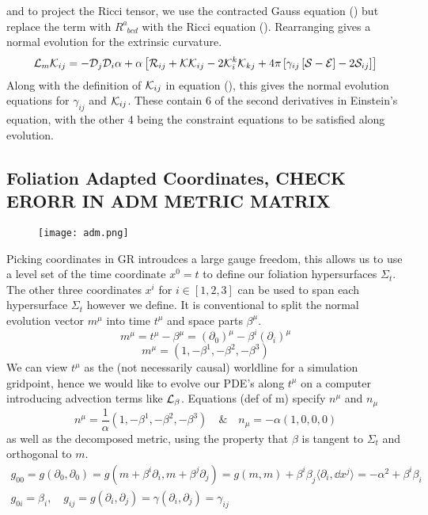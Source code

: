and to project the Ricci tensor, we use the contracted Gauss equation () but replace the term with $R^a_{\,\,\,bcd}$ with the Ricci equation (). Rearranging gives a normal evolution for the extrinsic curvature.
\begin{equation} \mathcal{L}_m \mathcal{K}_{ij} = -\mathcal{D}_j\mathcal{D}_i \alpha + \alpha \left[ \mathcal{R}_{ij} + \mathcal{K}\mathcal{K}_{ij} - 2\mathcal{K}^k_i\mathcal{K}_{kj} + 4\pi \left[ \gamma_{ij}\left[ \mathcal{S}-\mathcal{E}\right]-2\mathcal{S}_{ij}\right]\right]\end{equation}
Along with the definition of $\mathcal{K}_{ij}$ in equation (), this gives the normal evolution equations for $\gamma_{ij}$ and $\mathcal{K}_{ij}$. These contain 6 of the second derivatives in Einstein's equation, with the other 4 being the constraint equations to be satisfied along evolution.

\subsection{Foliation Adapted Coordinates, CHECK ERORR IN ADM METRIC MATRIX}
\begin{wrapfigure}{r}{0.65\textwidth}
    \texttt{[image: adm.png]}
\end{wrapfigure}
Picking coordinates in GR introudces a large gauge freedom, this allows us to use a level set of the time coordinate $x^0=t$ to define our foliation hypersurfaces $\Sigma_t$. The other three coordinates $x^i$ for $i\in[1,2,3]$ can be used to span each hypersurface $\Sigma_t$ however we define. It is conventional to split the normal evolution vector $m^\mu$ into time $t^\mu$ and space parts $\beta^\mu$.
\begin{equation} m^\mu = t^\mu - \beta^\mu  = (\partial_0)^\mu - \beta^i (\partial_i)^\mu \end{equation}
\begin{equation} m^\mu = \left( 1,-\beta^1,-\beta^2,-\beta^3\right) \end{equation}
We can view $t^\mu$ as the (not necessarily causal) worldline for a simulation gridpoint, hence we would like to evolve our PDE's along $t^\mu$ on a computer introducing advection terms like $\mathcal{L}_\beta$. Equations (def of m) specify $n^\mu$ and $n_\mu$
\begin{equation} n^\mu =  \frac{1}{\alpha}\left( 1,-\beta^1,-\beta^2,-\beta^3\right)\quad \& \quad n_\mu = -\alpha\left( 1,0,0,0\right)\end{equation}
as well as the decomposed metric, using the property that $\beta$ is tangent to $\Sigma_t$ and orthogonal to $m$.
\begin{gather} g_{00} = g(\partial_0,\partial_0) = g(m + \beta^i \partial_i,m + \beta^j\partial_j) = g(m,m) + \beta^i \beta_j \langle \partial_i,\dd x^j \rangle = -\alpha^2 + \beta^i \beta_i \nonumber\\
 g_{0i} = \beta_i,\quad
 g_{ij} = g(\partial_i,\partial_j) = \gamma(\partial_i,\partial_j) = \gamma_{ij}\nonumber\end{gather}
